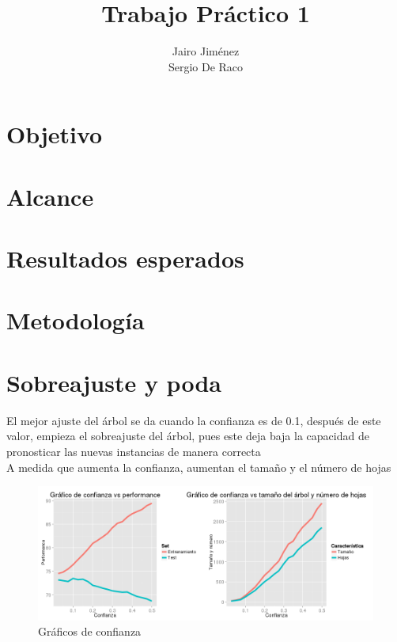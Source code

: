 \documentclass[]{article}
\title{Trabajo Práctico 1}
\author{Jairo Jiménez \\
	Sergio De Raco}
\begin{document}
\maketitle


\section*{Objetivo}

\section*{Alcance}

\section*{Resultados esperados}

\section*{Metodología}

\section{Sobreajuste y poda}

El mejor ajuste del árbol se da cuando la confianza es de 0.1, después de este valor, empieza el sobreajuste del árbol, pues este deja baja la capacidad de pronosticar las nuevas instancias de manera correcta\\
A medida que aumenta la confianza, aumentan el tamaño y el número de hojas


\begin{figure}
	\includegraphics[scale = 0.4]{Punto_1_Graficos_Mezclados}
	\caption[Confianza vs ajuste]{Gráficos de confianza}
	\label{P1Conf}
\end{figure}
\end{document}
